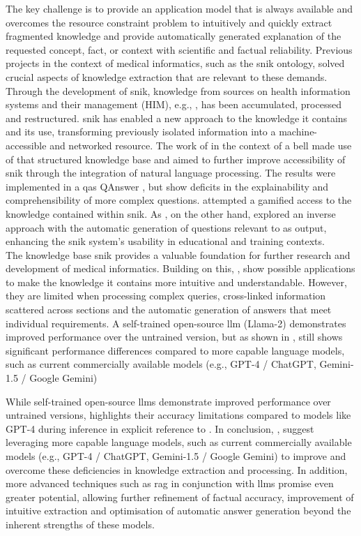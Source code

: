 The key challenge is to provide an application model that is always available and overcomes the resource constraint problem to intuitively and quickly extract fragmented knowledge and provide automatically generated explanation of the requested concept, fact, or context with scientific and factual reliability.
%
Previous projects in the context of medical informatics, such as the \ac{snik} ontology, solved crucial aspects of knowledge extraction that are relevant to these demands.
Through the development of \ac{snik}, knowledge from sources on health information systems and their management (HIM), e.g., \citet{bb2}, has been accumulated, processed and restructured.    
\ac{snik} has enabled a new approach to the knowledge it contains and its use, transforming previously isolated information into a machine-accessible and networked resource.
The work of \citet{hannesbell, hannesbell_skill} in the context of a \ac{bell} made use of that structured knowledge base and aimed to further improve accessibility of \ac{snik} through the integration of natural language processing. 
The results were implemented in a \ac{qas} QAnswer \citep{qanswer}, but show deficits in the explainability and comprehensibility of more complex questions. 
\citet{snikquiz} attempted a gamified access to the knowledge contained within \ac{snik}. 
As \citet{arneba}, on the other hand, explored an inverse approach with the automatic generation of questions relevant to \citep{snikquiz} as output, enhancing the \ac{snik} system's usability in educational and training contexts.\\
The knowledge base \ac{snik} provides a valuable foundation for further research and development of medical informatics.
Building on this, \citet{hannesbell, hannesbell_skill}, \citep{qanswer} show possible applications to make the knowledge it contains more intuitive and understandable.
However, they are limited when processing complex queries, cross-linked information scattered across sections and the automatic generation of answers that meet individual requirements.
%
A self-trained open-source \ac{llm} (Llama-2) demonstrates improved performance over the untrained version, but as shown in \citet{Paul_Keller}, still shows significant performance differences compared to more capable language models, such as current commercially available models (e.g., GPT-4 / ChatGPT, Gemini-1.5 / Google Gemini)

While self-trained open-source \ac{llm}s demonstrate improved performance over untrained versions, \citet{Paul_Keller} highlights their accuracy limitations compared to models like GPT-4 during inference in explicit reference to \citet{bb2}.
In conclusion, \citet{Paul_Keller}, suggest leveraging more capable language models, such as current commercially available models (e.g., GPT-4 / ChatGPT, Gemini-1.5 / Google Gemini) to improve and overcome these deficiencies in knowledge extraction and processing.
In addition, more advanced techniques such as \ac{rag} in conjunction with \ac{llm}s promise even greater potential, allowing further refinement of factual accuracy, improvement of intuitive extraction and optimisation of automatic answer generation beyond the inherent strengths of these models.\\
%

